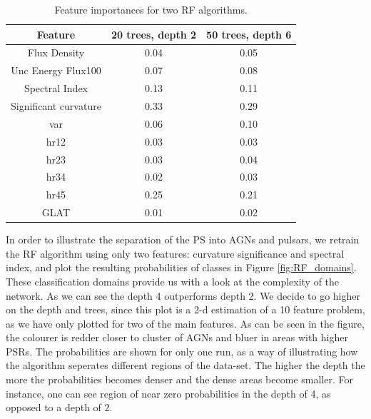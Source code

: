 \begin{table}[!h]
    \tiny
    \centering
    \renewcommand{\tabcolsep}{1mm}
\renewcommand{\arraystretch}{1}

    \begin{tabular}{|c|c|c|}
    \hline
    Feature &  20 trees, depth 2& 50 trees, depth 6\\
    \hline
    Flux Density& 0.04 & 0.05        \\
    \hline
    Unc Energy Flux100& 0.07     & 0.08 \\
    \hline %
   Spectral Index & 0.13     &   0.11\\
    \hline %
    Significant curvature& 0.33 &0.29  \\
    \hline
   var&  0.06   &  0.10  \\
    \hline %
    hr12& 0.03 &0.03 \\
    \hline
     hr23& 0.03 &0.04 \\
    \hline
    hr34& 0.02 &0.03 \\
    \hline
   hr45& 0.25 &0.21 \\
    \hline
    GLAT&0.01&0.02\\
    \hline
    \end{tabular}
    \vspace{0.4cm}
    \caption{Feature importances for two RF algorithms.}
    \label{tab:feat_imp}
\end{table}


In order to illustrate the separation of the PS into AGNs and pulsars, we retrain the RF algorithm using only two features: curvature significance and spectral index, and plot the resulting probabilities of classes in Figure \ref{fig:RF_domains}. These classification domains provide us with a look at the complexity of the network. As we can see the depth 4 outperforms depth 2. We decide to go higher on the depth and trees, since this plot is a 2-d estimation of a 10 feature problem, as we have only plotted for two of the main features. As can be seen in the figure, the colourer is redder closer to cluster of AGNs and bluer in areas with higher PSRs. The probabilities are shown for only one run, as a way of illustrating how the algorithm seperates different regions of the data-set. The higher the depth the more the probabilities becomes denser and the dense areas become smaller. For instance, one can see region of near zero probabilities in the depth of 4, as opposed to a depth of 2.  

